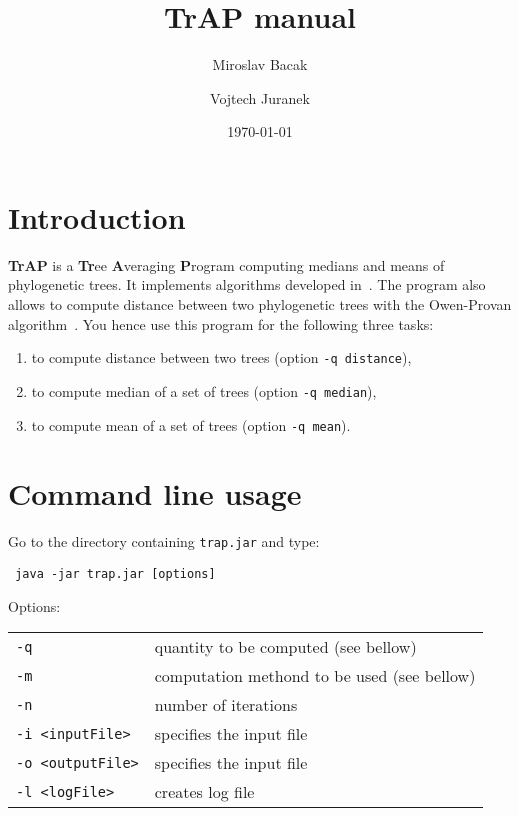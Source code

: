 \documentclass[a4paper,12pt]{amsart}
\title{TrAP manual}
\author{Miroslav Bacak \and Vojtech Juranek}
\date{\today}
\begin{document}
\maketitle


\section{Introduction}

\textbf{TrAP} is a \textbf{Tr}ee \textbf{A}veraging \textbf{P}rogram computing medians and means of phylogenetic trees. It implements algorithms developed in~\cite{mm}. The program also allows to compute distance between two phylogenetic trees with the Owen-Provan algorithm~\cite{owenprovan}. You hence use this program for the following three tasks:
\begin{enumerate}
 \item to compute distance between two trees (option \texttt{-q distance}),
 \item to compute median of a set of trees (option \texttt{-q median}),
 \item to compute mean of a set of trees (option \texttt{-q mean}).
\end{enumerate}


\section{Command line usage}
Go to the directory containing \texttt{trap.jar} and type:
\begin{verbatim}
 java -jar trap.jar [options]
\end{verbatim}

\vspace{12pt}
Options:

\begin{tabular}{ll}
\\
\texttt{-q} & quantity to be computed (see bellow) \\ 
\texttt{-m} & computation methond to be used (see bellow) \\ 
\texttt{-n} & number of iterations \\ 
\texttt{-i <inputFile>} & specifies the input file \\ 
\texttt{-o <outputFile>} & specifies the input file \\ 
\texttt{-l <logFile>} & creates log file \\ 
\end{tabular}
\end{document}
